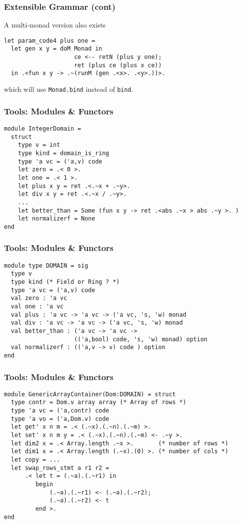 \documentclass{beamer}
\begin{document}
\begin{frame}[fragile]
    \frametitle{Extensible Grammar (cont) }
A multi-monad version also exists
\begin{verbatim}
let param_code4 plus one =
  let gen x y = doM Monad in
                    ce <-- retN (plus y one);
                    ret (plus ce (plus x ce))
  in .<fun x y -> .~(runM (gen .<x>. .<y>.))>.
\end{verbatim}
which will use \verb+Monad.bind+ instead of \verb+bind+.
\end{frame}

\begin{frame}[fragile]
    \frametitle{Tools: Modules \& Functors}
\begin{verbatim}
module IntegerDomain = 
  struct
    type v = int
    type kind = domain_is_ring
    type 'a vc = ('a,v) code
    let zero = .< 0 >.  
    let one = .< 1 >. 
    let plus x y = ret .<.~x + .~y>. 
    let div x y = ret .<.~x / .~y>.
    ...
    let better_than = Some (fun x y -> ret .<abs .~x > abs .~y >. )
    let normalizerf = None 
end
\end{verbatim}
\end{frame}

\begin{frame}[fragile]
    \frametitle{Tools: Modules \& Functors}
\begin{verbatim}
module type DOMAIN = sig
  type v
  type kind (* Field or Ring ? *)
  type 'a vc = ('a,v) code
  val zero : 'a vc
  val one : 'a vc
  val plus : 'a vc -> 'a vc -> ('a vc, 's, 'w) monad
  val div : 'a vc -> 'a vc -> ('a vc, 's, 'w) monad
  val better_than : ('a vc -> 'a vc -> 
                    (('a,bool) code, 's, 'w) monad) option
  val normalizerf : (('a,v -> v) code ) option
end 
\end{verbatim}
\end{frame}

\begin{frame}[fragile]
    \frametitle{Tools: Modules \& Functors}
\begin{verbatim}
module GenericArrayContainer(Dom:DOMAIN) = struct
  type contr = Dom.v array array (* Array of rows *)
  type 'a vc = ('a,contr) code
  type 'a vo = ('a,Dom.v) code
  let get' x n m = .< (.~x).(.~n).(.~m) >.
  let set' x n m y = .< (.~x).(.~n).(.~m) <- .~y >.
  let dim2 x = .< Array.length .~x >.       (* number of rows *)
  let dim1 x = .< Array.length (.~x).(0) >. (* number of cols *)
  let copy = ...
  let swap_rows_stmt a r1 r2 =
      .< let t = (.~a).(.~r1) in
         begin 
             (.~a).(.~r1) <- (.~a).(.~r2);
             (.~a).(.~r2) <- t
         end >.
end
\end{verbatim}
\end{frame}
\end{document}

